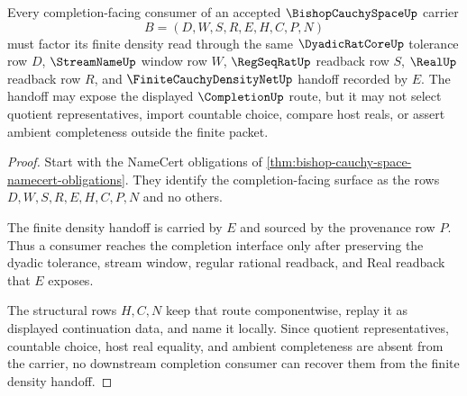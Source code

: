 \begin{theorem}
\label{thm:bishop-cauchy-space-finite-density-handoff}
Every completion-facing consumer of an accepted $\BishopCauchySpaceUp$ carrier
$$
B=(D,W,S,R,E,H,C,P,N)
$$
must factor its finite density read through the same $\DyadicRatCoreUp$ tolerance row $D$, $\StreamNameUp$ window row $W$, $\RegSeqRatUp$ readback row $S$, $\RealUp$ readback row $R$, and $\FiniteCauchyDensityNetUp$ handoff recorded by $E$. The handoff may expose the displayed $\CompletionUp$ route, but it may not select quotient representatives, import countable choice, compare host reals, or assert ambient completeness outside the finite packet.
\end{theorem}
\begin{proof}
Start with the NameCert obligations of \autoref{thm:bishop-cauchy-space-namecert-obligations}. They identify the completion-facing surface as the rows $D,W,S,R,E,H,C,P,N$ and no others.

The finite density handoff is carried by $E$ and sourced by the provenance row $P$. Thus a consumer reaches the completion interface only after preserving the dyadic tolerance, stream window, regular rational readback, and Real readback that $E$ exposes.

The structural rows $H,C,N$ keep that route componentwise, replay it as displayed continuation data, and name it locally. Since quotient representatives, countable choice, host real equality, and ambient completeness are absent from the carrier, no downstream completion consumer can recover them from the finite density handoff.
\end{proof}


\begin{closurestatus}{\BishopCauchySpaceUp}
  \theoryclosure{\seedClosure}
  \formalstatus{\unformalizedV}
\end{closurestatus}
